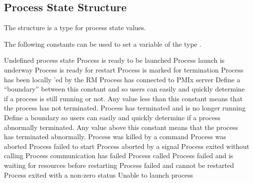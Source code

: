 \subsection{Process State Structure}
\label{api:struct:processstate}

The  structure is a  type for process state values.

The following constants can be used to set a variable of the type .


\begin{constantdesc}
%
Undefined process state
%
Process is ready to be launched
%
Process launch is underway
%
Process is ready for restart
%
Process is marked for termination
%
Process has been locally 'ed by the \ac{RM}
%
Process has connected to PMIx server
%
Define a ``boundary'' between this constant and  so users can easily and quickly determine if a process is still running or not.
Any value less than this constant means that the process has not terminated.
%
Process has terminated and is no longer running
%
Define a boundary so users can easily and quickly determine if a process abnormally terminated.
Any value above this constant means that the process has terminated abnormally.
%
Process was killed by a command
%
Process was aborted
%
Process failed to start
%
Process aborted by a signal
%
Process exited without calling 
%
Process communication has failed
%
Process called 
%
Process failed and is waiting for resources before restarting
%
Process failed and cannot be restarted
%
Process exited with a non-zero status
%
Unable to launch process
%
\end{constantdesc}


